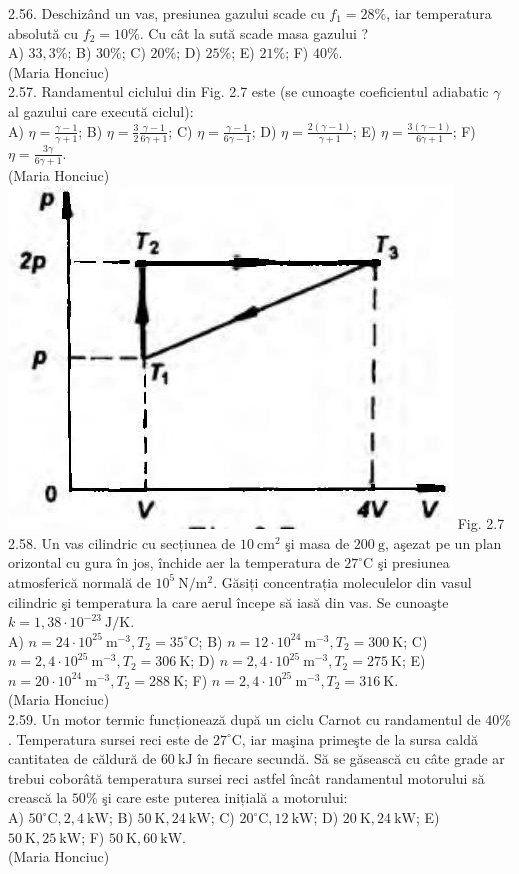 2.56. Deschizând un vas, presiunea gazului scade cu $f_{1}=28 \%$, iar temperatura absolută cu $f_{2}=10 \%$. Cu cât la sută scade masa gazului ?\\ A) $33,3 \%$; B) $30 \%$; C) $20 \%$; D) $25 \%$; E) $21 \%$; F) $40 \%$.\\ (Maria Honciuc)\\

2.57. Randamentul ciclului din Fig. 2.7 este (se cunoaşte coeficientul adiabatic $\gamma$ al gazului care execută ciclul):\\ A) $\eta=\frac{\gamma-1}{\gamma+1}$; B) $\eta=\frac{3}{2} \frac{\gamma-1}{6 \gamma+1}$; C) $\eta=\frac{\gamma-1}{6 \gamma-1}$; D) $\eta=\frac{2(\gamma-1)}{\gamma+1}$; E) $\eta=\frac{3(\gamma-1)}{6 \gamma+1}$; F) $\eta=\frac{3 \gamma}{6 \gamma+1}$.\\ (Maria Honciuc)\\ \includegraphics[width=0.4\linewidth]{images/2025_07_01_5b3ff9fa0d508c8e9f17g-085} Fig. 2.7\\

2.58. Un vas cilindric cu secțiunea de $10 \mathrm{~cm}^{2}$ şi masa de $200 \mathrm{~g}$, aşezat pe un plan orizontal cu gura în jos, închide aer la temperatura de $27^{\circ} \mathrm{C}$ şi presiunea atmosferică normală de $10^{5} \mathrm{~N} / \mathrm{m}^{2}$. Găsiți concentrația moleculelor din vasul cilindric şi temperatura la care aerul începe să iasă din vas. Se cunoaşte $k=1,38 \cdot 10^{-23} \mathrm{~J} / \mathrm{K}$.\\ A) $n=24 \cdot 10^{25} \mathrm{~m}^{-3} , T_{2}=35^{\circ} \mathrm{C}$; B) $n=12 \cdot 10^{24} \mathrm{~m}^{-3} , T_{2}=300 \mathrm{~K}$; C) $n=2,4 \cdot 10^{25} \mathrm{~m}^{-3} , T_{2}=306 \mathrm{~K}$; D) $n=2,4 \cdot 10^{25} \mathrm{~m}^{-3} , T_{2}=275 \mathrm{~K}$; E) $n=20 \cdot 10^{24} \mathrm{~m}^{-3} , T_{2}=288 \mathrm{~K}$; F) $n=2,4 \cdot 10^{25} \mathrm{~m}^{-3} , T_{2}=316 \mathrm{~K}$.\\ (Maria Honciuc)\\

2.59. Un motor termic funcționează după un ciclu Carnot cu randamentul de $40 \%$. Temperatura sursei reci este de $27^{\circ} \mathrm{C}$, iar maşina primeşte de la sursa caldă cantitatea de căldură de $60 \mathrm{~kJ}$ în fiecare secundă. Să se găsească cu câte grade ar trebui coborâtă temperatura sursei reci astfel încât randamentul motorului să crească la $50 \%$ şi care este puterea inițială a motorului:\\ A) $50^{\circ} \mathrm{C} , 2,4 \mathrm{~kW}$; B) $50 \mathrm{~K} , 24 \mathrm{~kW}$; C) $20^{\circ} \mathrm{C} , 12 \mathrm{~kW}$; D) $20 \mathrm{~K} , 24 \mathrm{~kW}$; E) $50 \mathrm{~K} , 25 \mathrm{~kW}$; F) $50 \mathrm{~K} , 60 \mathrm{~kW}$.\\ (Maria Honciuc)\\

